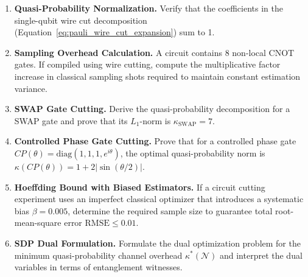 \begin{enumerate}[label=\textbf{4.\arabic*.}]
    \item \textbf{Quasi-Probability Normalization.} Verify that the coefficients in the single-qubit wire cut decomposition (Equation~\ref{eq:pauli_wire_cut_expansion}) sum to 1.
    \item \textbf{Sampling Overhead Calculation.} A circuit contains 8 non-local CNOT gates. If compiled using wire cutting, compute the multiplicative factor increase in classical sampling shots required to maintain constant estimation variance.
    \item \textbf{SWAP Gate Cutting.} Derive the quasi-probability decomposition for a SWAP gate and prove that its $L_1$-norm is $\kappa_{\text{SWAP}} = 7$.
    \item \textbf{Controlled Phase Gate Cutting.} Prove that for a controlled phase gate $CP(\theta) = \text{diag}(1, 1, 1, e^{i\theta})$, the optimal quasi-probability norm is $\kappa(CP(\theta)) = 1 + 2|\sin(\theta/2)|$.
    \item \textbf{Hoeffding Bound with Biased Estimators.} If a circuit cutting experiment uses an imperfect classical optimizer that introduces a systematic bias $\beta = 0.005$, determine the required sample size to guarantee total root-mean-square error $\text{RMSE} \le 0.01$.
    \item \textbf{SDP Dual Formulation.} Formulate the dual optimization problem for the minimum quasi-probability channel overhead $\kappa^*(\mathcal{N})$ and interpret the dual variables in terms of entanglement witnesses.
\end{enumerate}
